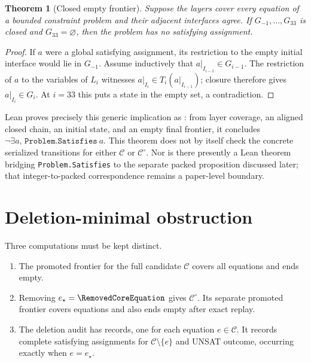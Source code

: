 \documentclass[11pt,twoside]{article}
\newtheorem{theorem}[definition]{Theorem}
\theoremstyle{remark}
\newcommand{\Candidate}{\ensuremath{\mathcal{C}}}
\newcommand{\Core}{\ensuremath{\mathcal{C}^{\circ}}}
\begin{document}
\begin{theorem}[Closed empty frontier]
\label{thm:closed-empty-frontier}
Suppose the layers cover every equation of a bounded constraint problem and
their adjacent interfaces agree.  If $G_{-1},\ldots,G_{33}$ is closed and
$G_{33}=\varnothing$, then the problem has no satisfying assignment.
\end{theorem}

\begin{proof}
If $a$ were a global satisfying assignment, its restriction to the empty
initial interface would lie in $G_{-1}$.  Assume inductively that
$a|_{I_{i-1}}\in G_{i-1}$.  The restriction of $a$ to the variables of
$L_i$ witnesses
$a|_{I_i}\in T_i(a|_{I_{i-1}})$; closure therefore gives
$a|_{I_i}\in G_i$.  At $i=33$ this puts a state in the empty set, a
contradiction.
\end{proof}

Lean proves precisely this generic implication as
\GenericSoundnessTheorem: from layer coverage, an aligned closed chain, an
initial state, and an empty final frontier, it concludes
$\neg\exists a,\,\texttt{Problem.Satisfies}\ a$.  This theorem does not by
itself check the concrete serialized transitions for either $\Candidate$ or
$\Core$.  Nor is there presently a Lean theorem bridging
\texttt{Problem.Satisfies} to the separate packed proposition discussed
later; that integer-to-packed correspondence remains a paper-level boundary.

\section{Deletion-minimal obstruction}
\label{sec:deletion-minimality}

Three computations must be kept distinct.
\begin{enumerate}[leftmargin=*,itemsep=3pt]
  \item The promoted frontier for the full candidate $\Candidate$ covers all
        \CandidateEquationCount{} equations and ends empty.
  \item Removing $e_\star=\RemovedCoreEquation$ gives $\Core$.  Its separate
        promoted frontier covers \CoreEquationCount{} equations and also ends
        empty after exact replay.
  \item The deletion audit has \DeletionAuditCount{} records, one for each
        equation $e\in\Candidate$.  It records \SatDeletionCount{} complete
        satisfying assignments for $\Candidate\setminus\{e\}$ and
        \UnsatDeletionCount{} UNSAT outcome, occurring exactly when
        $e=e_\star$.
\end{enumerate}
\end{document}
